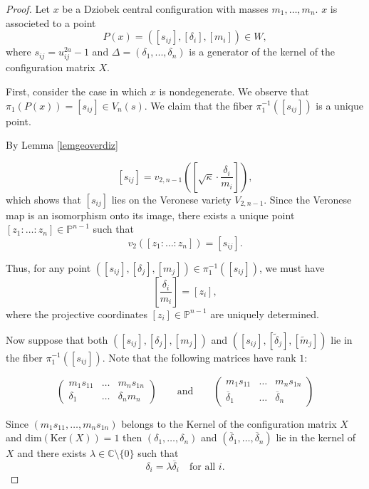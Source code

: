 \documentclass{amsart}
\theoremstyle{definition}
\theoremstyle{remark}
\numberwithin{equation}{section}
\begin{document}
\begin{proof}
Let $x$ be a Dziobek central configuration with masses $m_1, \dots, m_n$. $x$ is associeted to a point
\[
P(x) = ([s_{ij}], [\delta_i], [m_i]) \in W,
\]
where $s_{ij} = u_{ij}^{2a} - 1$ and   $\Delta=(\delta_1,...,\delta_n)$ is a generator of the kernel of the configuration matrix $X$.

First, consider the case in which $x$ is nondegenerate. We observe that $ \pi_1(P(x))=[s_{ij}]\in V_{n}(s)$. We claim that the fiber $\pi_1^{-1}([s_{ij}])$ is a unique point.




By Lemma \ref{lemgeoverdiz}

\[
[s_{ij}] = v_{2,n-1}\left( \left[ \sqrt{\kappa} \cdot \frac{\delta_i}{m_i} \right] \right),
\]
which shows that $[s_{ij}]$ lies on the Veronese variety $V_{2,n-1}$. Since the Veronese map is an isomorphism onto its image, there exists a unique point $[z_1 : \dots : z_n] \in \mathbb{P}^{n-1}$ such that
\[
v_2([z_1 : \dots : z_n]) = [s_{ij}].
\]

Thus, for any point $([s_{ij}], [\delta_j], [m_j]) \in \pi_1^{-1}([s_{ij}])$, we must have
\[
\left[ \frac{\delta_i}{m_i} \right] = [z_i],
\]
where the projective coordinates $[z_i] \in \mathbb{P}^{n-1}$ are uniquely determined.

Now suppose that both $([s_{ij}], [\delta_j], [m_j])$ and $([s_{ij}], [\tilde{\delta}_j], [\tilde{m}_j])$ lie in the fiber $\pi_1^{-1}([s_{ij}])$. Note that the following matrices have rank $1$:


$$\begin{pmatrix}
    m_1s_{11} & \dots & m_ns_{1n} \\
    \delta_1 & \dots & \delta_n{m_n}
\end{pmatrix}  \qquad \text{and} \qquad \begin{pmatrix}
    m_1s_{11} & \dots & m_ns_{1n} \\
     \overline{\delta}_1 & \dots &  \overline{\delta}_n
\end{pmatrix}  $$



Since $(m_1s_{11},  \dots  ,m_ns_{1n})$ belongs to the Kernel of the configuration matrix $X$ and $\text{dim}(\text{Ker}(X))=1$ then $(\delta_1, \dots, \delta_n)$ and $(\overline{\delta}_1, \dots, \overline{\delta}_n)$ lie in the kernel of $X$ and there exists $\lambda \in \mathbb{C}\setminus\{0\}$ such that
\[
\delta_i = \lambda \overline{\delta}_i \quad \text{for all } i.
\]


\end{proof}
\end{document}
